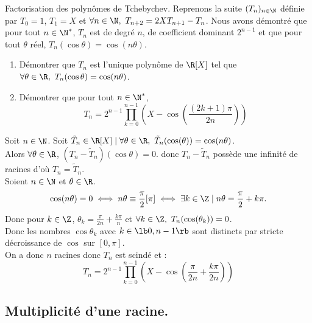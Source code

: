 \documentclass[11pt]{article}
\begin{document}
\vspace*{-0.8cm}

\begin{ex}{Factorisation des polynômes de Tchebychev.}{}
    Reprenons la suite $(T_n)_{n\in\N}$ définie par $T_0=1$, $T_1=X$ et $\forall n \in \N, ~ T_{n+2}=2XT_{n+1}-T_n$.\n
    Nous avons démontré que pour tout $n\in\N^*$, $T_n$ est de degré $n$, de coefficient dominant $2^{n-1}$ et que pour tout $\theta$ réel, $T_n(\cos\theta)=\cos(n\theta)$.
    \begin{enumerate}
        \item Démontrer que $T_n$ est l'unique polynôme de $\R[X]$ tel que $\forall \theta \in \R, ~ T_n(\cos\theta)=\cos(n\theta)$.
        \item Démontrer que pour tout $n\in\N^*$,
        \begin{equation*}
            T_n=2^{n-1}\prod_{k=0}^{n-1}\left( X - \cos\left( \frac{(2k+1)\pi}{2n} \right) \right)
        \end{equation*}
    \end{enumerate}
    \tcblower
     Soit $n\in\N$. Soit $\tilde{T}_n\in\R[X]\mid\forall \theta\in\R,~\tilde{T}_n(\cos(\theta))=\cos(n\theta)$.\\
    Alors $\forall \theta\in\R$, $(T_n-\tilde{T}_n)(\cos\theta)=0$. donc $T_n-\tilde{T}_n$ possède une infinité de racines d'où $T_n=\tilde{T}_n$.\\
     Soient $n\in\N$ et $\theta\in\R$.
    \begin{equation*}
        \cos(n\theta)=0\iff n\theta\equiv\frac{\pi}{2}[\pi]\iff\exists k \in \Z \mid n\theta=\frac{\pi}{2}+k\pi.
    \end{equation*}
    Donc pour $k\in\Z$, $\theta_k=\frac{\pi}{2n}+\frac{k\pi}{n}$ et $\forall k \in \Z, ~ T_n(\cos(\theta_k))=0$.\\
    Donc les nombres $\cos\theta_k$ avec $k\in\lb0,n-1\rb$ sont distincts par stricte décroissance de $\cos$ sur $[0,\pi]$.\\
    On a donc $n$ racines donc $T_n$ est scindé et :
    \begin{equation*}
        T_n=2^{n-1}\prod_{k=0}^{n-1}\left(X-\cos\left( \frac{\pi}{2n} + \frac{k\pi}{2n} \right)\right)
    \end{equation*}
\end{ex}

\vspace*{-0.8cm}

\subsection{Multiplicité d'une racine.}
\end{document}
